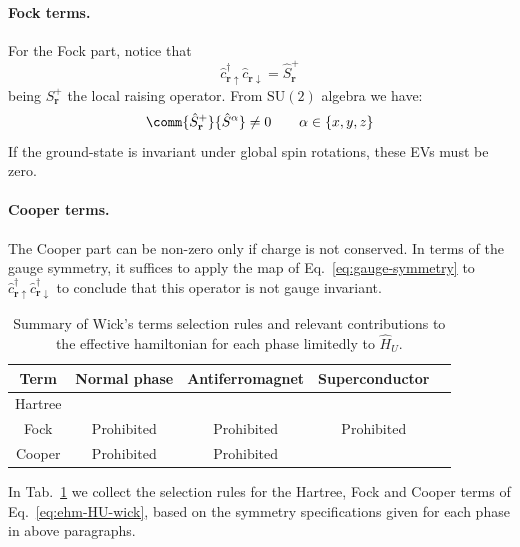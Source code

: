 \paragraph{Fock terms.} For the Fock part, notice that
\[
	\hat c_{\mathbf{r}\uparrow}^\dagger \hat c_{\mathbf{r}\downarrow} = \hat S_\mathbf{r}^+
\]
being $S_\mathbf{r}^+$ the local raising operator. From $\mathrm{SU}(2)$ algebra we have:
\[
	\comm{\hat S_\mathbf{r}^+}{\hat S^\alpha} \neq 0
	\qquad
	\alpha \in \lbrace x,y,z \rbrace
\]
If the ground-state is invariant under global spin rotations, these EVs must be zero.

\paragraph{Cooper terms.} The Cooper part can be non-zero only if charge is not conserved. In terms of the gauge symmetry, it suffices to apply the map of Eq.~\eqref{eq:gauge-symmetry} to $\hat c_{\mathbf{r}\uparrow}^\dagger \hat c_{\mathbf{r}\downarrow}^\dagger$ to conclude that this operator is not gauge invariant. 

\begin{table}
	\centering
	\begin{tabular}{c c c c c}\textbf{Term} & \textbf{Normal phase} & \textbf{Antiferromagnet} & \textbf{Superconductor} \\
		\midrule
		Hartree & & & \\
		Fock & Prohibited & Prohibited & Prohibited \\
		Cooper & Prohibited & Prohibited & \\
		\midrule
	\end{tabular}
	\caption{Summary of Wick's terms selection rules and relevant contributions to the effective hamiltonian for each phase limitedly to $\hat H_U$.}
	\label{tab:HU-sel-rules}
\end{table}

In Tab.~\ref{tab:HU-sel-rules} we collect the selection rules for the Hartree, Fock and Cooper terms of Eq.~\eqref{eq:ehm-HU-wick}, based on the symmetry specifications given for each phase in above paragraphs.


